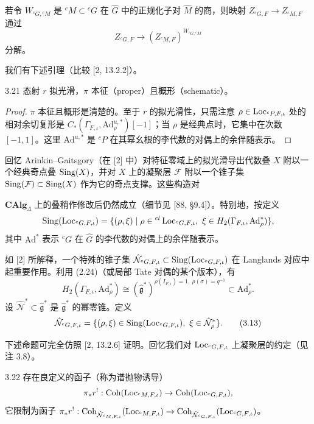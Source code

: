 若令 $W_{{}^{c}G,{}^{c}M}$ 是 ${}^cM\subset{}^cG$ 在 $\hat G$ 中的正规化子对 $\hat M$ 的商，则映射 $Z_{{}^{c}G,F}\to Z_{{}^{c}M,F}$ 通过
\begin{equation}
Z_{{}^{c}G,F}\to(Z_{{}^{c}M,F})^{W_{{}^{c}G,{}^{c}M}} \tag{3.12}
\end{equation}
分解。

我们有下述引理（比较 [2, 13.2.2]）。
\begin{lem}{3.21}
态射 $r$ 拟光滑，$\pi$ 本征（proper）且概形（schematic）。
\end{lem}
\begin{proof}
$\pi$ 本征且概形是清楚的。至于 $r$ 的拟光滑性，只需注意 $\rho\in\operatorname{Loc}_{{}^{c}P,F,\iota}$ 处的相对余切复形是 $C_{*}(\Gamma_{F,\iota},\mathrm{Ad}^{u,*}_{\rho})[-1]$；当 $\rho$ 是经典点时，它集中在次数 $[-1,1]$。这里 $\mathrm{Ad}^{u,*}$ 是 ${}^cP$ 在其幂幺根的李代数的对偶上的余伴随表示。
\end{proof}

回忆 Arinkin–Gaitsgory（在 [2] 中）对特征零域上的拟光滑导出代数叠 $X$ 附以一个经典奇点叠 $\operatorname{Sing}(X)$，并对 $X$ 上的凝聚层 $\mathcal F$ 附以一个锥子集 $\operatorname{Sing}(\mathcal F)\subset\operatorname{Sing}(X)$ 作为它的奇点支撑。这些构造对

$\mathbf{CAlg}_{\Lambda}$ 上的叠稍作修改后仍然成立（细节见 [88, §9.4]）。特别地，按定义
\[
\operatorname{Sing}(\operatorname{Loc}_{{}^{c}G,F,\iota})=\{(\rho,\xi)\mid \rho\in{}^{cl}\operatorname{Loc}_{{}^{c}G,F,\iota},\ \xi\in H_{2}(\Gamma_{F,\iota},\mathrm{Ad}^{*}_{\rho})\},
\]
其中 $\mathrm{Ad}^{*}$ 表示 ${}^cG$ 在 $\hat G$ 的李代数的对偶上的余伴随表示。

如 [2] 所解释，一个特殊的锥子集 $\hat{\mathcal N}_{{}^{c}G,F,\iota}\subset\operatorname{Sing}(\operatorname{Loc}_{{}^{c}G,F,\iota})$ 在 Langlands 对应中起重要作用。利用 (2.24)（或局部 Tate 对偶的某个版本），有
\[
H_{2}(\Gamma_{F,\iota},\mathrm{Ad}^{*}_{\rho})\cong(\hat{\mathfrak g}^{*})^{\rho(I_{F,\iota})=1,\ \rho(\sigma)=q^{-1}}\subset\mathrm{Ad}^{*}_{\rho}.
\]
设 $\hat{\mathcal N}^{*}\subset\hat{\mathfrak g}^{*}$ 是 $\hat{\mathfrak g}^{*}$ 的幂零锥。定义
\begin{equation}
\hat{\mathcal N}_{{}^{c}G,F,\iota}=\{(\rho,\xi)\in\Sing(\Loc_{{}^{c}G,F,\iota}),\ \xi\in\hat{\mathcal N}^{*}_{\rho}\}. \tag{3.13}
\end{equation}

下述命题可完全仿照 [2, 13.2.6] 证明。回忆我们对 $\operatorname{Loc}_{{}^{c}G,F,\iota}$ 上凝聚层的约定（见注 3.8）。
\begin{prop}{3.22}
存在良定义的函子（称为谱抛物诱导）
\[
\pi_{*}r^{!}:\operatorname{Coh}(\operatorname{Loc}_{{}^{c}M,F,\iota})\to\operatorname{Coh}(\operatorname{Loc}_{{}^{c}G,F,\iota}),
\]
它限制为函子 $\pi_{*}r^{!}:\operatorname{Coh}_{\hat{\mathcal N}_{{}^{c}M,F,\iota}}(\operatorname{Loc}_{{}^{c}M,F,\iota})\to\operatorname{Coh}_{\hat{\mathcal N}_{{}^{c}G,F,\iota}}(\operatorname{Loc}_{{}^{c}G,F,\iota})$。
\end{prop}

